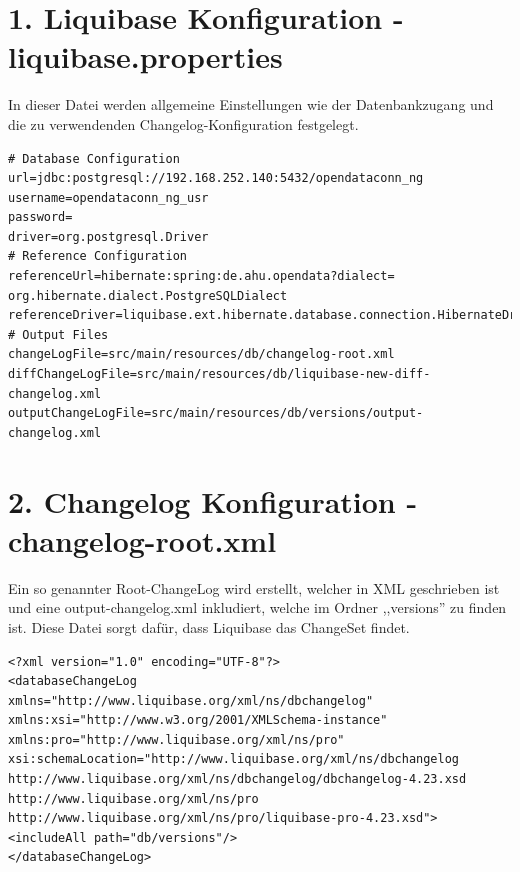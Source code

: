 \documentclass[a4paper,12pt]{scrreprt}
\begin{document}
	\section*{\small \textbf{1. Liquibase Konfiguration - liquibase.properties}}
	In dieser Datei werden allgemeine Einstellungen wie der Datenbankzugang und die zu verwendenden Changelog-Konfiguration festgelegt.
\begin{lstlisting}[language=properties]
# Database Configuration
url=jdbc:postgresql://192.168.252.140:5432/opendataconn_ng
username=opendataconn_ng_usr
password=
driver=org.postgresql.Driver
# Reference Configuration
referenceUrl=hibernate:spring:de.ahu.opendata?dialect=
org.hibernate.dialect.PostgreSQLDialect
referenceDriver=liquibase.ext.hibernate.database.connection.HibernateDriver
# Output Files
changeLogFile=src/main/resources/db/changelog-root.xml
diffChangeLogFile=src/main/resources/db/liquibase-new-diff-changelog.xml
outputChangeLogFile=src/main/resources/db/versions/output-changelog.xml
\end{lstlisting}
	\section*{\small \textbf{2. Changelog Konfiguration - changelog-root.xml}}
	Ein so genannter Root-ChangeLog wird erstellt, welcher in XML geschrieben ist und eine output-changelog.xml inkludiert, welche im Ordner ,,versions'' zu finden ist. Diese Datei sorgt dafür, dass Liquibase das ChangeSet findet.
\begin{lstlisting}
<?xml version="1.0" encoding="UTF-8"?>   
<databaseChangeLog
xmlns="http://www.liquibase.org/xml/ns/dbchangelog"
xmlns:xsi="http://www.w3.org/2001/XMLSchema-instance"
xmlns:pro="http://www.liquibase.org/xml/ns/pro"
xsi:schemaLocation="http://www.liquibase.org/xml/ns/dbchangelog
http://www.liquibase.org/xml/ns/dbchangelog/dbchangelog-4.23.xsd
http://www.liquibase.org/xml/ns/pro 
http://www.liquibase.org/xml/ns/pro/liquibase-pro-4.23.xsd">  
<includeAll path="db/versions"/>  
</databaseChangeLog>
\end{lstlisting}
\end{document}

